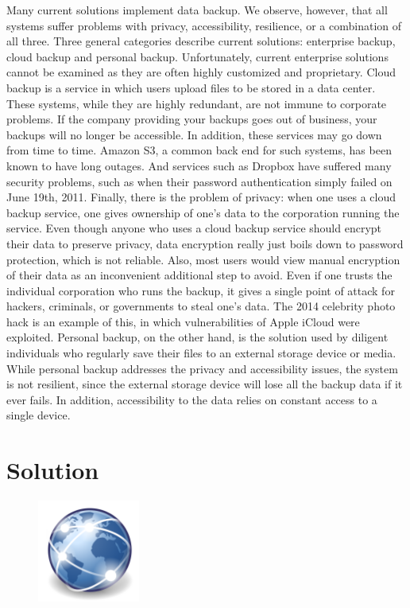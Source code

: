 Many current solutions implement data backup. We observe, however, that all systems suffer problems with privacy, accessibility, resilience, or a combination of all three. Three general categories describe current solutions: enterprise backup, cloud backup and personal backup. Unfortunately, current enterprise solutions cannot be examined as they are often highly customized and proprietary. Cloud backup is a service in which users upload files to be stored in a data center. These systems, while they are highly redundant, are not immune to corporate problems. If the company providing your backups goes out of business, your backups will no longer be accessible. In addition, these services may go down from time to time. Amazon S3, a common back end for such systems, has been known to have long outages. \cite{gigaom} \cite{rightscale}  And services such as Dropbox have suffered many security problems, such as when their password authentication simply failed on June 19th, 2011. \cite{dropbox_fail} Finally, there is the problem of privacy: when one uses a cloud backup service, one gives ownership of one's data to the corporation running the service.  Even though anyone who uses a cloud backup service should encrypt their data to preserve privacy, data encryption really just boils down to password protection, which is not reliable. \cite{password}  Also, most users would view manual encryption of their data as an inconvenient additional step to avoid.  Even if one trusts the individual corporation who runs the backup, it gives a single point of attack for hackers, criminals, or governments to steal one's data.  The 2014 celebrity photo hack is an example of this, in which vulnerabilities of Apple iCloud were exploited. \cite{theguardian}  Personal backup, on the other hand, is the solution used by diligent individuals who regularly save their files to an external storage device or media. While personal backup addresses the privacy and accessibility issues, the system is not resilient, since the external storage device will lose all the backup data if it ever fails. \cite{backblaze} In addition, accessibility to the data relies on constant access to a single device.


\section{Solution}

\begin{figure}
	\begin{center}
		\includegraphics[width=0.3\textwidth]{images/network.png}
	\end{center}
\end{figure}

